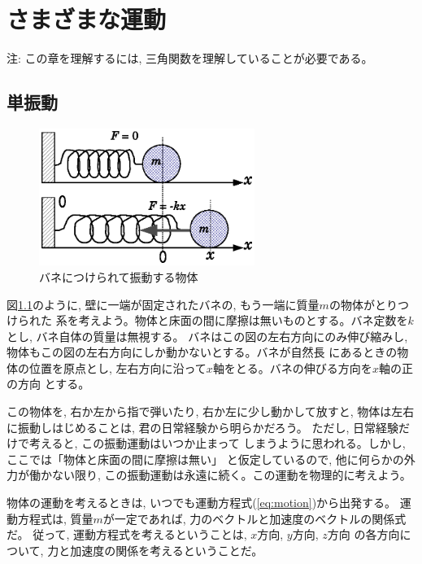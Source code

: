\chapter{さまざまな運動}

注: この章を理解するには, 三角関数を理解していることが必要である。\mv

\section{単振動}
\begin{figure}[h]
    \centering
    \includegraphics[width=7cm]{spring_vib.eps}
    \caption{バネにつけられて振動する物体}\label{fig:spring_vib}
\end{figure}

図\ref{fig:spring_vib}のように, 壁に一端が固定されたバネの, もう一端に質量$m$の物体がとりつけられた
系を考えよう。物体と床面の間に摩擦は無いものとする。バネ定数を$k$とし, バネ自体の質量は無視する。
バネはこの図の左右方向にのみ伸び縮みし, 物体もこの図の左右方向にしか動かないとする。バネが自然長
にあるときの物体の位置を原点とし, 左右方向に沿って$x$軸をとる。バネの伸びる方向を$x$軸の正の方向
とする。

この物体を, 右か左から指で弾いたり, 右か左に少し動かして放すと, 
物体は左右に振動しはじめることは, 君の日常経験から明らかだろう。
ただし, 日常経験だけで考えると, この振動運動はいつか止まって
しまうように思われる。しかし, ここでは「物体と床面の間に摩擦は無い」
と仮定しているので, 他に何らかの外力が働かない限り, 
この振動運動は永遠に続く。この運動を物理的に考えよう。

物体の運動を考えるときは, いつでも運動方程式(\ref{eq:motion})から出発する。
運動方程式は, 質量$m$が一定であれば, 力のベクトルと加速度のベクトルの関係式だ。
従って, 運動方程式を考えるということは, $x$方向, $y$方向, $z$方向
の各方向について, 力と加速度の関係を考えるということだ。

